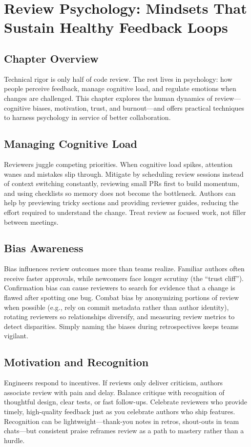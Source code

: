 \chapter{Review Psychology: Mindsets That Sustain Healthy Feedback Loops}

\section{Chapter Overview}
Technical rigor is only half of code review. The rest lives in psychology: how people perceive feedback, manage cognitive load, and regulate emotions when changes are challenged. This chapter explores the human dynamics of review---cognitive biases, motivation, trust, and burnout---and offers practical techniques to harness psychology in service of better collaboration.

\section{Managing Cognitive Load}
Reviewers juggle competing priorities. When cognitive load spikes, attention wanes and mistakes slip through. Mitigate by scheduling review sessions instead of context switching constantly, reviewing small PRs first to build momentum, and using checklists so memory does not become the bottleneck. Authors can help by previewing tricky sections and providing reviewer guides, reducing the effort required to understand the change. Treat review as focused work, not filler between meetings.

\section{Bias Awareness}
Bias influences review outcomes more than teams realize. Familiar authors often receive faster approvals, while newcomers face longer scrutiny (the ``trust cliff''). Confirmation bias can cause reviewers to search for evidence that a change is flawed after spotting one bug. Combat bias by anonymizing portions of review when possible (e.g., rely on commit metadata rather than author identity), rotating reviewers so relationships diversify, and measuring review metrics to detect disparities. Simply naming the biases during retrospectives keeps teams vigilant.

\section{Motivation and Recognition}
Engineers respond to incentives. If reviews only deliver criticism, authors associate review with pain and delay. Balance critique with recognition of thoughtful design, clear tests, or fast follow-ups. Celebrate reviewers who provide timely, high-quality feedback just as you celebrate authors who ship features. Recognition can be lightweight---thank-you notes in retros, shout-outs in team chats---but consistent praise reframes review as a path to mastery rather than a hurdle.

